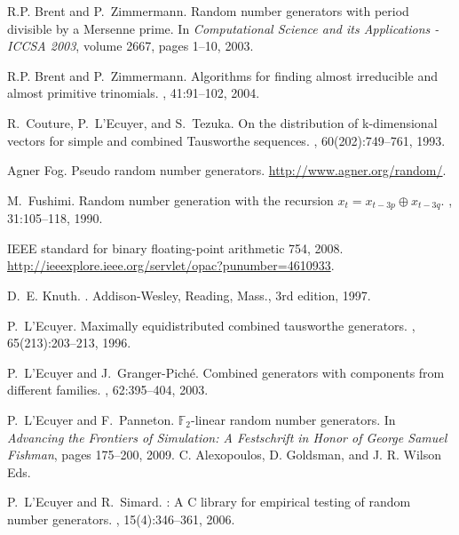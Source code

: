 \documentclass{svmult}
\begin{document}

%
\begin{thebibliography}{10}

R.P. Brent and P.~Zimmermann.
\newblock Random number generators with period divisible by a {Mersenne} prime.
\newblock In {\em Computational Science and its Applications - ICCSA 2003},
  volume 2667, pages 1--10, 2003.

R.P. Brent and P.~Zimmermann.
\newblock Algorithms for finding almost irreducible and almost primitive
  trinomials.
, 41:91--102, 2004.

R.~Couture, P.~L'Ecuyer, and S.~Tezuka.
\newblock On the distribution of k-dimensional vectors for simple and combined
  {Tausworthe} sequences.
, 60(202):749--761, 1993.

Agner Fog.
\newblock Pseudo random number generators.
\newblock \url{http://www.agner.org/random/}.

M.~Fushimi.
\newblock Random number generation with the recursion $x_t = x_{t-3p}\oplus
  x_{t-3q}$.
, 31:105--118,
  1990.

{IEEE} standard for binary floating-point arithmetic 754, 2008.
\newblock \url{http://ieeexplore.ieee.org/servlet/opac?punumber=4610933}.

D.~E. Knuth.
.
\newblock Addison-Wesley, Reading, Mass., 3rd edition, 1997.

P.~L'Ecuyer.
\newblock Maximally equidistributed combined tausworthe generators.
, 65(213):203--213, 1996.

P.~L'Ecuyer and J.~Granger-Pich\'{e}.
\newblock Combined generators with components from different families.
, 62:395--404, 2003.

P.~L'Ecuyer and F.~Panneton.
\newblock $\mathbb{F}_2$-linear random number generators.
\newblock In {\em Advancing the Frontiers of Simulation: A Festschrift in Honor
  of George Samuel Fishman}, pages 175--200, 2009.
\newblock C. Alexopoulos, D. Goldsman, and J. R. Wilson Eds.

P.~L'Ecuyer and R.~Simard.
: {A} {C} library for empirical testing of random number
  generators.
, 15(4):346--361,
  2006.


\end{thebibliography}
\end{document}
